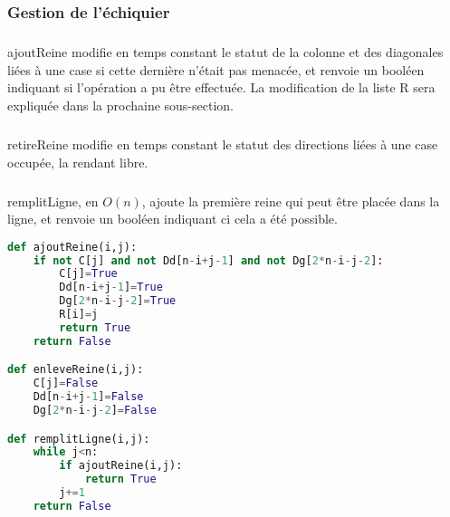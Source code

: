 \documentclass[a4paper]{article}
\begin{document}
\subsubsection{Gestion de l'échiquier}
\subparagraph{}
ajoutReine modifie en temps constant le statut de la colonne et des diagonales liées à une case si cette dernière n'était pas menacée, et renvoie un booléen indiquant si l'opération a pu être effectuée. La modification de la liste R sera expliquée dans la prochaine sous-section.
\subparagraph{}
retireReine modifie en temps constant le statut des directions liées à une case occupée, la rendant libre.
\subparagraph{}
remplitLigne, en $O(n)$, ajoute la première reine qui peut être placée dans la ligne, et renvoie un booléen indiquant ci cela a été possible.
\begin{lstlisting}[language=Python,keywordstyle=\color{blue},stringstyle=\color{red},commentstyle=\color{green}]
def ajoutReine(i,j):
    if not C[j] and not Dd[n-i+j-1] and not Dg[2*n-i-j-2]:
        C[j]=True
        Dd[n-i+j-1]=True
        Dg[2*n-i-j-2]=True
        R[i]=j
        return True
    return False

def enleveReine(i,j):
    C[j]=False
    Dd[n-i+j-1]=False
    Dg[2*n-i-j-2]=False

def remplitLigne(i,j):
    while j<n:
        if ajoutReine(i,j):
            return True
        j+=1
    return False
\end{lstlisting}
\end{document}
